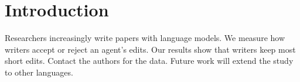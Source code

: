 \documentclass{article}
\begin{document}
\section{Introduction}
Researchers increasingly write papers with language models.
We measure how writers accept or reject an agent's edits. %
Our results show that writers keep most short edits.
Contact the authors for the data.
Future work will extend the study to other languages.
\end{document}
